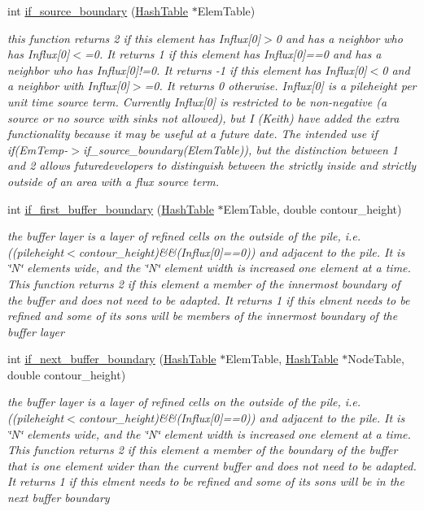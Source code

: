 \begin{CompactItemize}
int \hyperlink{classElement_a112}{if\_\-source\_\-boundary} (\hyperlink{classHashTable}{Hash\-Table} $\ast$Elem\-Table)
\begin{CompactList}\small\item\em this function returns 2 if this element has Influx\mbox{[}0\mbox{]}$>$0 and has a neighbor who has Influx\mbox{[}0\mbox{]}$<$=0. It returns 1 if this element has Influx\mbox{[}0\mbox{]}==0 and has a neighbor who has Influx\mbox{[}0\mbox{]}!=0. It returns -1 if this element has Influx\mbox{[}0\mbox{]}$<$0 and a neighbor with Influx\mbox{[}0\mbox{]}$>$=0. It returns 0 otherwise. Influx\mbox{[}0\mbox{]} is a pileheight per unit time source term. Currently Influx\mbox{[}0\mbox{]} is restricted to be non-negative (a source or no source with sinks not allowed), but I (Keith) have added the extra functionality because it may be useful at a future date. The intended use if if(Em\-Temp-$>$if\_\-source\_\-boundary(Elem\-Table)), but the distinction between 1 and 2 allows futuredevelopers to distinguish between the strictly inside and strictly outside of an area with a flux source term. \item\end{CompactList}\item 
int \hyperlink{classElement_a113}{if\_\-first\_\-buffer\_\-boundary} (\hyperlink{classHashTable}{Hash\-Table} $\ast$Elem\-Table, double contour\_\-height)
\begin{CompactList}\small\item\em the buffer layer is a layer of refined cells on the outside of the pile, i.e. ((pileheight$<$contour\_\-height)\&\&(Influx\mbox{[}0\mbox{]}==0)) and adjacent to the pile. It is \char`\"{}N\char`\"{} elements wide, and the \char`\"{}N\char`\"{} element width is increased one element at a time. This function returns 2 if this element a member of the innermost boundary of the buffer and does not need to be adapted. It returns 1 if this elment needs to be refined and some of its sons will be members of the innermost boundary of the buffer layer \item\end{CompactList}\item 
int \hyperlink{classElement_a114}{if\_\-next\_\-buffer\_\-boundary} (\hyperlink{classHashTable}{Hash\-Table} $\ast$Elem\-Table, \hyperlink{classHashTable}{Hash\-Table} $\ast$Node\-Table, double contour\_\-height)
\begin{CompactList}\small\item\em the buffer layer is a layer of refined cells on the outside of the pile, i.e. ((pileheight$<$contour\_\-height)\&\&(Influx\mbox{[}0\mbox{]}==0)) and adjacent to the pile. It is \char`\"{}N\char`\"{} elements wide, and the \char`\"{}N\char`\"{} element width is increased one element at a time. This function returns 2 if this element a member of the boundary of the buffer that is one element wider than the current buffer and does not need to be adapted. It returns 1 if this elment needs to be refined and some of its sons will be in the next buffer boundary \item\end{CompactList}\item 

\end{CompactItemize}
